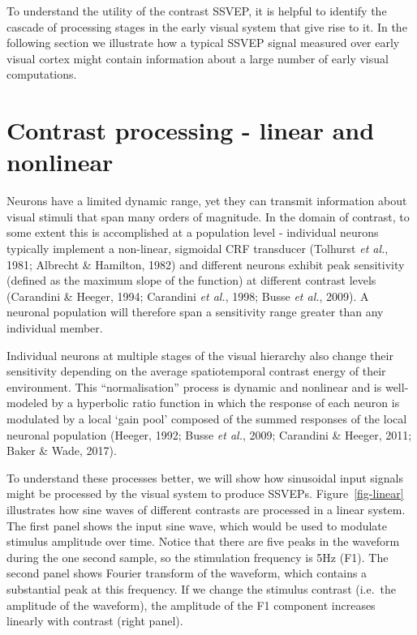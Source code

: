 \documentclass[
  letterpaper,
  DIV=11,
  numbers=noendperiod]{scrartcl}
\begin{document}
To understand the utility of the contrast SSVEP, it is helpful to
identify the cascade of processing stages in the early visual system
that give rise to it. In the following section we illustrate how a
typical SSVEP signal measured over early visual cortex might contain
information about a large number of early visual computations.

\section{Contrast processing - linear and
nonlinear}\label{contrast-processing---linear-and-nonlinear}

Neurons have a limited dynamic range, yet they can transmit information
about visual stimuli that span many orders of magnitude. In the domain
of contrast, to some extent this is accomplished at a population level -
individual neurons typically implement a non-linear, sigmoidal CRF
transducer (Tolhurst \emph{et al.}, 1981; Albrecht \& Hamilton, 1982)
and different neurons exhibit peak sensitivity (defined as the maximum
slope of the function) at different contrast levels (Carandini \&
Heeger, 1994; Carandini \emph{et al.}, 1998; Busse \emph{et al.}, 2009).
A neuronal population will therefore span a sensitivity range greater
than any individual member.

Individual neurons at multiple stages of the visual hierarchy also
change their sensitivity depending on the average spatiotemporal
contrast energy of their environment. This ``normalisation'' process is
dynamic and nonlinear and is well-modeled by a hyperbolic ratio function
in which the response of each neuron is modulated by a local `gain pool'
composed of the summed responses of the local neuronal population
(Heeger, 1992; Busse \emph{et al.}, 2009; Carandini \& Heeger, 2011;
Baker \& Wade, 2017).

To understand these processes better, we will show how sinusoidal input
signals might be processed by the visual system to produce SSVEPs.
Figure~\ref{fig-linear} illustrates how sine waves of different
contrasts are processed in a linear system. The first panel shows the
input sine wave, which would be used to modulate stimulus amplitude over
time. Notice that there are five peaks in the waveform during the one
second sample, so the stimulation frequency is 5Hz (F1). The second
panel shows Fourier transform of the waveform, which contains a
substantial peak at this frequency. If we change the stimulus contrast
(i.e.~the amplitude of the waveform), the amplitude of the F1 component
increases linearly with contrast (right panel).
\end{document}
